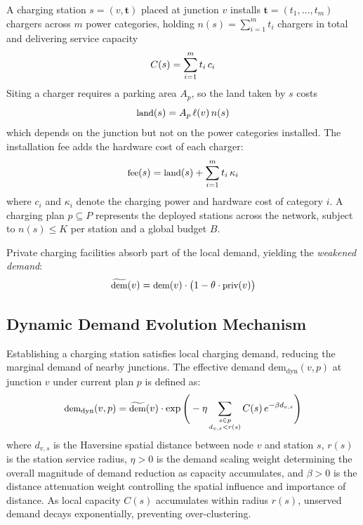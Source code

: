 \documentclass[10pt, conference, a4paper, compsocconf]{IEEEtran}
\begin{document}
A charging station $s = (v, \mathbf{t})$ placed at junction $v$ installs $\mathbf{t} = (t_1, \dots, t_m)$ chargers across $m$ power categories, holding $n(s) = \sum_{i=1}^m t_i$ chargers in total and delivering service capacity
\begin{equation}\small
C(s) = \sum_{i=1}^m t_i \, c_i
\end{equation}
Siting a charger requires a parking area $A_p$, so the land taken by $s$ costs
\begin{equation}\small
\text{land}(s) = A_p \, \ell(v) \, n(s)
\end{equation}
which depends on the junction but not on the power categories installed. The installation fee adds the hardware cost of each charger:
\begin{equation}\small
\text{fee}(s) = \text{land}(s) + \sum_{i=1}^m t_i \, \kappa_i
\end{equation}
where $c_i$ and $\kappa_i$ denote the charging power and hardware cost of category $i$. A charging plan $p \subseteq P$ represents the deployed stations across the network, subject to $n(s) \leq K$ per station and a global budget $B$.

Private charging facilities absorb part of the local demand, yielding the \emph{weakened demand}:
\begin{equation}\small
\widetilde{\text{dem}}(v) = \text{dem}(v) \cdot \big( 1 - \theta \cdot \text{priv}(v) \big)
\end{equation}

\subsection{Dynamic Demand Evolution Mechanism}

Establishing a charging station satisfies local charging demand, reducing the marginal demand of nearby junctions. The effective demand $\text{dem}_{\text{dyn}}(v, p)$ at junction $v$ under current plan $p$ is defined as:
\begin{equation}\small
\text{dem}_{\text{dyn}}(v, p) = \widetilde{\text{dem}}(v) \cdot \exp \Bigg( -\eta \sum_{\substack{s \in p \\ d_{v,s} < r(s)}} C(s) \, e^{-\beta d_{v,s}} \Bigg)
\end{equation}
where $d_{v,s}$ is the Haversine spatial distance between node $v$ and station $s$, $r(s)$ is the station service radius, $\eta > 0$ is the demand scaling weight determining the overall magnitude of demand reduction as capacity accumulates, and $\beta > 0$ is the distance attenuation weight controlling the spatial influence and importance of distance. As local capacity $C(s)$ accumulates within radius $r(s)$, unserved demand decays exponentially, preventing over-clustering.
\end{document}
